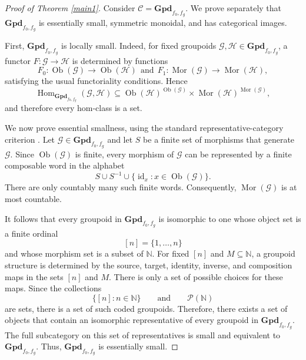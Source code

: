 \documentclass{amsart}
\begin{document}
\begin{proof}[Proof of Theorem \ref{main1}]
Consider $\mathcal{C}=\mathbf{Gpd}_{f_0,f_g}.$
We prove separately that $\mathbf{Gpd}_{f_0,f_g}$ is essentially small, symmetric monoidal, and has categorical images.

First, $\mathbf{Gpd}_{f_0,f_g}$ is locally small. Indeed, for fixed groupoids $\mathcal{G},\mathcal{H}\in\mathbf{Gpd}_{f_0,f_g}$, a functor $F\colon\mathcal{G}\to\mathcal{H}$ is determined by functions
\[
F_0\colon\operatorname{Ob}(\mathcal{G})
\longrightarrow\operatorname{Ob}(\mathcal{H})
\ \ 
\mbox{and} \ \ F_1\colon\operatorname{Mor}(\mathcal{G})
\longrightarrow\operatorname{Mor}(\mathcal{H}),
\]
satisfying the usual functoriality conditions. Hence
\[
\operatorname{Hom}_{\mathbf{Gpd}_{f_0,f_g}}(\mathcal{G},\mathcal{H})
\subseteq
\operatorname{Ob}(\mathcal{H})^{\operatorname{Ob}(\mathcal{G})}
\times
\operatorname{Mor}(\mathcal{H})^{\operatorname{Mor}(\mathcal{G})},
\]
and therefore every hom-class is a set.

We now prove essential smallness, using the standard representative-category criterion \cite[Section~IV.4]{maclane1998categories}. Let $\mathcal{G}\in\mathbf{Gpd}_{f_0,f_g}$ and let $S$ be a finite set of morphisms that generate $\mathcal{G}$. Since $\operatorname{Ob}(\mathcal{G})$ is finite, every morphism of $\mathcal{G}$ can be represented by a finite composable word in the alphabet
\[
S\cup S^{-1}\cup
\{\operatorname{id}_x:x\in\operatorname{Ob}(\mathcal{G})\}.
\]
There are only countably many such finite words. Consequently,
$\operatorname{Mor}(\mathcal{G})$ is at most countable.

It follows that every groupoid in $\mathbf{Gpd}_{f_0,f_g}$ is isomorphic to one whose object set is a finite ordinal
\[
[n]=\{1,\ldots,n\}
\]
and whose morphism set is a subset of $\mathbb{N}$. For fixed
$[n]$ and $M\subseteq\mathbb{N}$, a groupoid structure is determined
by the source, target, identity, inverse, and composition maps in the sets $[n]$ and $M$. There is only a set of possible choices for these maps.
Since the collections
\[
\{[n]:n\in\mathbb{N}\}
\qquad\text{and}\qquad
\mathcal{P}(\mathbb{N})
\]
are sets, there is a set of such coded groupoids. Therefore, there
exists a set of objects that contain an isomorphic representative of
every groupoid in $\mathbf{Gpd}_{f_0,f_g}$. The full subcategory on this set of representatives is small and equivalent to $\mathbf{Gpd}_{f_0,f_g}$. Thus, $\mathbf{Gpd}_{f_0,f_g}$ is essentially small.


\end{proof}
\end{document}

